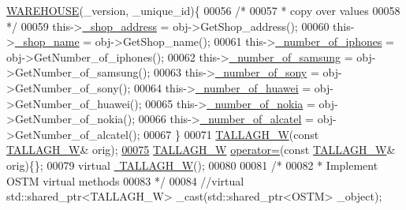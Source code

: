 \begin{DoxyCode}
      \hyperlink{class_w_a_r_e_h_o_u_s_e}{WAREHOUSE}(\_version, \_unique\_id)\{
00056         \textcolor{comment}{/*}
00057 \textcolor{comment}{         * copy over values}
00058 \textcolor{comment}{         */}
00059         this->\hyperlink{class_t_a_l_l_a_g_h___w_a268003f2cd359fa50c6061f1ad011c67_a268003f2cd359fa50c6061f1ad011c67}{\_shop\_address} = obj->GetShop\_address();
00060         this->\hyperlink{class_t_a_l_l_a_g_h___w_a2d63785f290e8be76f3c4543e5df9508_a2d63785f290e8be76f3c4543e5df9508}{\_shop\_name} = obj->GetShop\_name();
00061         this->\hyperlink{class_t_a_l_l_a_g_h___w_ad8a7847f895cd13b45331e4f3cd20c2e_ad8a7847f895cd13b45331e4f3cd20c2e}{\_number\_of\_iphones} = obj->GetNumber\_of\_iphones();
00062         this->\hyperlink{class_t_a_l_l_a_g_h___w_a2438dbd2a390036bfd35f46a63b5b9bf_a2438dbd2a390036bfd35f46a63b5b9bf}{\_number\_of\_samsung} = obj->GetNumber\_of\_samsung();
00063         this->\hyperlink{class_t_a_l_l_a_g_h___w_ab101d3ac8747eef48371cd9078d2366e_ab101d3ac8747eef48371cd9078d2366e}{\_number\_of\_sony} = obj->GetNumber\_of\_sony();
00064         this->\hyperlink{class_t_a_l_l_a_g_h___w_ab966ff243f14eefc346e0b031f21c9b6_ab966ff243f14eefc346e0b031f21c9b6}{\_number\_of\_huawei} = obj->GetNumber\_of\_huawei();
00065         this->\hyperlink{class_t_a_l_l_a_g_h___w_aa095820dca65526e795d64f31a3aaec1_aa095820dca65526e795d64f31a3aaec1}{\_number\_of\_nokia} = obj->GetNumber\_of\_nokia();
00066         this->\hyperlink{class_t_a_l_l_a_g_h___w_a034f2ba8c42c1b81ae947b15732e5881_a034f2ba8c42c1b81ae947b15732e5881}{\_number\_of\_alcatel} = obj->GetNumber\_of\_alcatel();
00067     \}
00071     \hyperlink{class_t_a_l_l_a_g_h___w_aeafc411edee7a3e8bfcc54fa478e2104_aeafc411edee7a3e8bfcc54fa478e2104}{TALLAGH\_W}(\textcolor{keyword}{const} \hyperlink{class_t_a_l_l_a_g_h___w}{TALLAGH\_W}& orig);
\hypertarget{_t_a_l_l_a_g_h___w_8h_source.tex_l00075}{}\hyperlink{class_t_a_l_l_a_g_h___w_a0ac3db0bae78cc4e59f175e90374ed50_a0ac3db0bae78cc4e59f175e90374ed50}{00075}     \hyperlink{class_t_a_l_l_a_g_h___w}{TALLAGH\_W} \hyperlink{class_t_a_l_l_a_g_h___w_a0ac3db0bae78cc4e59f175e90374ed50_a0ac3db0bae78cc4e59f175e90374ed50}{operator=}(\textcolor{keyword}{const} \hyperlink{class_t_a_l_l_a_g_h___w}{TALLAGH\_W}& orig)\{\};
00079     \textcolor{keyword}{virtual} \hyperlink{class_t_a_l_l_a_g_h___w_aad3a2ca2d942a0629716b1c9f446931f_aad3a2ca2d942a0629716b1c9f446931f}{~TALLAGH\_W}();
00080     
00081     \textcolor{comment}{/*}
00082 \textcolor{comment}{     * Implement OSTM virtual methods}
00083 \textcolor{comment}{     */}
00084     \textcolor{comment}{//virtual std::shared\_ptr<TALLAGH\_W> \_cast(std::shared\_ptr<OSTM> \_object);}

\end{DoxyCode}
